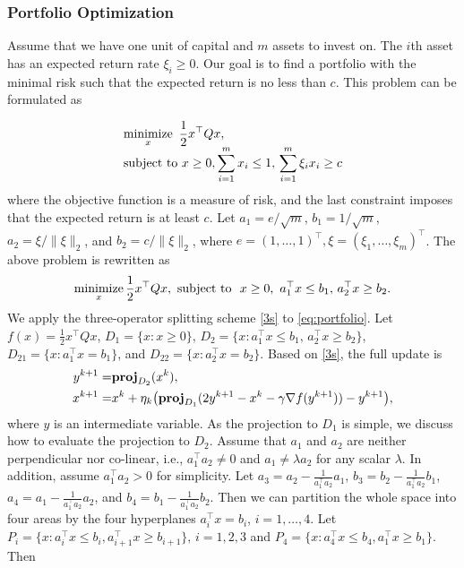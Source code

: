 \subsubsection{Portfolio Optimization}
Assume that we have one unit of capital and $m$ assets to invest on. The $i$th asset has an expected return rate $\xi_i\ge 0$. Our goal is to find a portfolio with the minimal risk such that the expected return is no less than $c$. This problem can be formulated as

\begin{equation*}
\begin{array}{l}
\displaystyle
\Min_x ~ \frac{1}{2} x^\top Q x, \\
\displaystyle
\text{subject to}~ x\ge0, \sum_{i=1}^m x_i\le 1,\, \sum_{i=1}^m\xi_i x_i\ge c 
\end{array}
\end{equation*}
where the objective function is a measure of risk, and the last constraint imposes that the expected return is at least $c$. Let $a_1=e/\sqrt{m}$, $b_1=1/\sqrt{m}$, $a_2=\xi/\|\xi\|_2$, and $b_2=c/\|\xi\|_2$, where $e = (1, \dots, 1)^\top, \xi = (\xi_1, \dots, \xi_m)^\top$. The above problem is rewritten as
\begin{equation}\label{eq:portfolio}
\Min_x \frac{1}{2} x^\top Q x,\ \text{subject to }\ x\ge0, ~a_1^\top x\le b_1,\, a_2^\top x\ge b_2.
\end{equation}
We apply the three-operator splitting scheme \eqref{3s} to \eqref{eq:portfolio}. Let $f(x)=\frac{1}{2}x^\top Q x$, $D_1=\{x: x\ge 0\}$, $D_2=\{x: a_1^\top x \le b_1,\, a_2^\top x\ge b_2\}$, $D_{21}=\{x: a_1^\top x=b_1\}$, and $D_{22}=\{x: a_2^\top x=b_2\}$. Based on \eqref{3s}, the full update is
\begin{subequations}\label{eq:3op-portfolio}
\begin{align}
y^{k+1}=&\prj_{D_2}(x^k),\\
x^{k+1}=&x^k+\eta_k\big(\prj_{D_1}(2y^{k+1}-x^k-\gamma \nabla f(y^{k+1}))-y^{k+1}\big), \end{align}
\end{subequations}
where $y$ is an intermediate variable. As the projection to $D_1$ is simple, we discuss how to evaluate the projection to $D_2$. Assume that $a_1$ and $a_2$ are neither perpendicular nor co-linear, i.e., $a_1^\top a_2\neq 0$ and $a_1\neq \lambda a_2$ for any scalar $\lambda$. In addition, assume $a_1^\top a_2>0$ for simplicity. Let $a_3=a_2-\frac{1}{a_1^\top a_2} a_1$, $b_3=b_2-\frac{1}{a_1^\top a_2} b_1$, $a_4=a_1-\frac{1}{a_1^\top a_2} a_2$, and $b_4=b_1-\frac{1}{a_1^\top a_2} b_2$. Then we can partition the whole space into four areas by the four hyperplanes $a_i^\top x=b_i$, $i=1,\ldots,4$. Let $P_i=\{x: a_i^\top x\le b_i, a_{i+1}^\top x\ge b_{i+1}\},\, i=1,2,3$ and $P_4=\{x: a_4^\top x\le b_4, a_1^\top x\ge b_1\}$. Then
